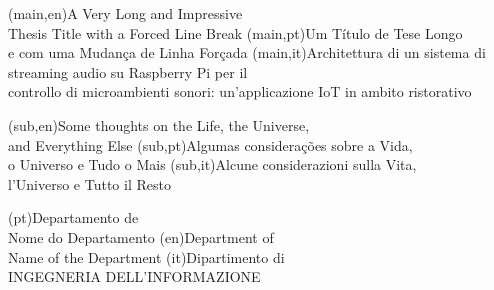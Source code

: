 
%


\nttitle(main,en){A Very Long and Impressive\\Thesis Title with a Forced Line Break}%
\nttitle(main,pt){Um Título de Tese Longo\\e com uma Mudança de Linha Forçada}%
\nttitle(main,it){Architettura di un sistema di streaming audio su Raspberry Pi per il\\controllo di microambienti sonori: un'applicazione IoT in ambito ristorativo}%

\nttitle(sub,en){Some thoughts on the Life, the Universe,\\and Everything Else}%
\nttitle(sub,pt){Algumas considerações sobre a Vida,\\o Universo e Tudo o Mais}%
\nttitle(sub,it){Alcune considerazioni sulla Vita,\\l'Universo e Tutto il Resto}%


\ntdepartment*(pt){Departamento de\\Nome do Departamento}
\ntdepartment*(en){Department of\\Name of the Department}
\ntdepartment*(it){Dipartimento di\\INGEGNERIA DELL'INFORMAZIONE}

